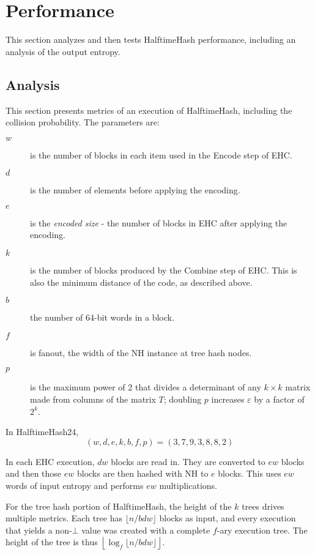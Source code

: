 \documentclass[runningheads]{llncs}
\begin{document}
\section{Performance}
\label{performance}

This section analyzes and then tests HalftimeHash performance, including an analysis of the output entropy.

\subsection{Analysis}
This section presents metrics of an execution of HalftimeHash, including the collision probability.
The parameters are:

\begin {description}
\item[$w$] is the number of blocks in each item used in the Encode step of EHC.
\item[$d$] is the number of elements before applying the encoding.
\item[$e$] is the {\em encoded size} - the number of blocks in EHC after applying the encoding.
\item[$k$] is the number of blocks produced by the Combine step of EHC.
  This is also the minimum distance of the code, as described above.
\item[$b$] the number of 64-bit words in a block.
\item[$f$] is fanout, the width of the NH instance at tree hash nodes.
\item[$p$] is the maximum power of 2 that divides a determinant of any $k \times k$ matrix made from columns of the matrix $T$; doubling $p$ increases $\varepsilon$ by a factor of $2^k$.
\end{description}

In HalftimeHash24, \[(w, d, e, k, b, f, p) = (3, 7, 9, 3, 8, 8, 2)\]

In each EHC execution, $d w$ blocks are read in.
They are converted to $e w$ blocks and then those $e w$ blocks are then hashed with NH to $e$ blocks.
This uses $e w$ words of input entropy and performs $e w$ multiplications.

For the tree hash portion of HalftimeHash, the height of the $k$ trees drives multiple metrics.
Each tree has $\lfloor n / b d w \rfloor$ blocks as input, and every execution that yields a non-$\bot$ value was created with a complete $f$-ary execution tree.
The height of the tree is thus $\left\lfloor \log_f \lfloor n / b d w \rfloor \right\rfloor$.
\end{document}
